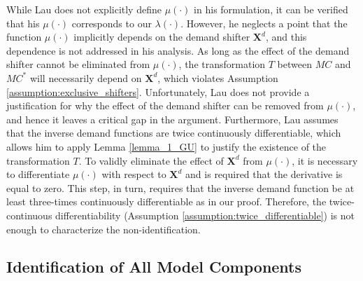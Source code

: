 \documentclass[11pt, a4paper]{article}
\begin{document}
While Lau does not explicitly define $\mu(\cdot)$ in his formulation, it can be verified that his $\mu(\cdot)$ corresponds to our $\lambda(\cdot)$.
However, he neglects a point that the function $\mu(\cdot)$ implicitly depends on the demand shifter $\bm{X}^{d}$, and this dependence is not addressed in his analysis.
As long as the effect of the demand shifter cannot be eliminated from $\mu(\cdot)$, the transformation $T$ between $MC$ and $MC^*$ will necessarily depend on $\bm{X}^{d}$, which violates Assumption \ref{assumption:exclusive_shifters}.
Unfortunately, Lau does not provide a justification for why the effect of the demand shifter can be removed from $\mu(\cdot)$, and hence it leaves a critical gap in the argument.
Furthermore, Lau assumes that the inverse demand functions are twice continuously differentiable, which allows him to apply Lemma \ref{lemma_1_GU} to justify the existence of the transformation $T$. 
To validly eliminate the effect of $\bm{X}^{d}$ from $\mu(\cdot)$, it is necessary to differentiate $\mu(\cdot)$ with respect to $\bm{X}^{d}$ and is required that the derivative is equal to zero.
This step, in turn, requires that the inverse demand function be at least three-times continuously differentiable as in our proof.
Therefore, the twice-continuous differentiability (Assumption \ref{assumption:twice_differentiable}) is not enough to characterize the non-identification.










\subsection{Identification of All Model Components}\label{subsec:identification_all_model_components}
\end{document}
